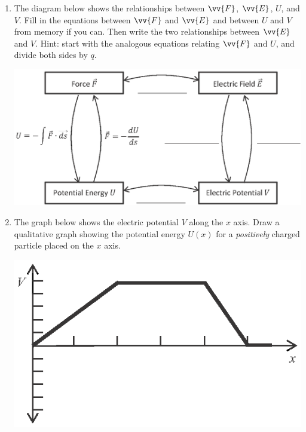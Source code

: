 \begin{enumerate}[wide, label=(\emph{\alph*})]

\item The diagram below shows the relationships between $\vv{F}$, $\vv{E}$, $U$, and $V$.  Fill in the equations between $\vv{F}$ and $\vv{E}$ and between $U$ and $V$ from memory if you can.  Then write the two relationships between $\vv{E}$ and $V$.  Hint: start with the analogous equations relating $\vv{F}$ and $U$, and divide both sides by $q$.  
\begin{center}
\includegraphics{potential_intro/concept_map_figs/concept_map_all_blanks.eps}
\end{center}

\item The graph below shows the electric potential $V$ along the $x$ axis.  Draw a qualitative graph showing the potential energy $U(x)$ for a \textit{positively} charged particle placed on the $x$ axis.  \label{part_potential_intro_given_V}
\begin{center}
\includegraphics{potential_intro/activity_5_figs/given_V.eps}


\end{center}
\end{enumerate}
